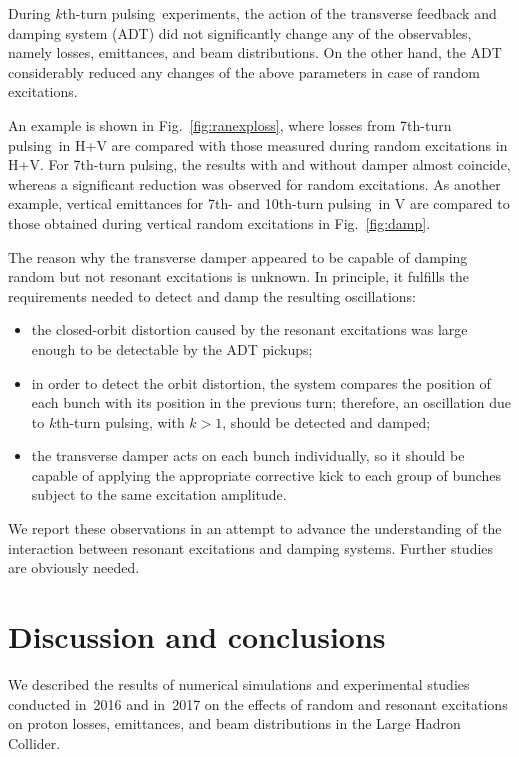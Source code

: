 \documentclass[aps
,prstab
,reprint
,longbibliography
,preprintnumbers
,showkeys
,amsfonts,amssymb,amsmath
,floatfix
]{revtex4-1}
\newcommand{\kthtp}{$k$th-turn pulsing}
\newcommand{\seventhtp}{7th-turn pulsing}
\newcommand{\tenthtp}{10th-turn pulsing}
\begin{document}
During \kthtp\ experiments, the action of the transverse feedback and
damping system (ADT) did not significantly change any of the
observables, namely losses, emittances, and beam distributions. On the
other hand, the ADT considerably reduced any changes of the above
parameters in case of random excitations.

An example is shown in Fig.~\ref{fig:ranexploss}, where losses from
\seventhtp\ in H+V are compared with those measured during random
excitations in H+V. For \seventhtp, the results with and without
damper almost coincide, whereas a significant reduction was observed
for random excitations. As another example, vertical emittances for
7th- and \tenthtp\ in V are compared to those obtained during vertical
random excitations in Fig.~\ref{fig:damp}.

The reason why the transverse damper appeared to be capable of damping
random but not resonant excitations is unknown. In principle, it
fulfills the requirements needed to detect and damp the resulting
oscillations:
%
\begin{itemize}
\item the closed-orbit distortion caused by the resonant excitations
  was large enough to be detectable by the ADT pickups;
\item in order to detect the orbit distortion, the system compares the
  position of each bunch with its position in the previous turn;
  therefore, an oscillation due to \kthtp, with $k > 1$, should be
  detected and damped;
\item the transverse damper acts on each bunch individually, so it
  should be capable of applying the appropriate corrective kick to
  each group of bunches subject to the same excitation amplitude.
\end{itemize}

We report these observations in an attempt to advance the
understanding of the interaction between resonant excitations and
damping systems. Further studies are obviously needed.



\section{Discussion and conclusions}
\label{sec:sum}

We described the results of numerical simulations and experimental
studies conducted in~2016 and in~2017 on the effects of random and
resonant excitations on proton losses, emittances, and beam
distributions in the Large Hadron Collider.
\end{document}
